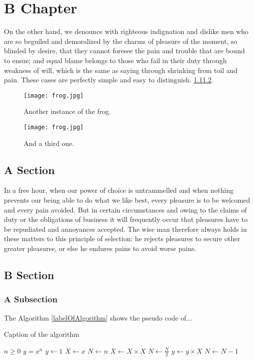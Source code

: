 \chapter{B Chapter}

On the other hand, we denounce with righteous indignation and dislike men who are so beguiled and demoralized by the charms of pleasure of the moment, so blinded by desire, that they cannot foresee the pain and trouble that are bound to ensue; and equal blame belongs to those who fail in their duty through weakness of will, which is the same as saying through shrinking from toil and pain. These cases are perfectly simple and easy to distinguish. \ref{fig:frogger}\ref{fig:froggerr}.

\begin{figure}[!htbp]
    \centering
    \texttt{[image: frog.jpg]}
    \caption{\label{fig:frogger}Another instance of the frog.}
\end{figure}
\begin{figure}[!htbp]
    \centering
    \texttt{[image: frog.jpg]}
    \caption{\label{fig:froggerr}And a third one.}
\end{figure}

\section{A Section}

In a free hour, when our power of choice is untrammelled and when nothing prevents our being able to do what we like best, every pleasure is to be welcomed and every pain avoided. But in certain circumstances and owing to the claims of duty or the obligations of business it will frequently occur that pleasures have to be repudiated and annoyances accepted. The wise man therefore always holds in these matters to this principle of selection: he rejects pleasures to secure other greater pleasures, or else he endures pains to avoid worse pains.

\section{B Section}

\subsection{A Subsection}
The Algorithm \ref{labelOfAlgorithm} shows the pseudo code of...

\begin{algorithm}
\caption{Caption of the algorithm}
\label{labelOfAlgorithm}
\begin{algorithmic}
\Require $n \geq 0$ %
\Ensure $y = x^n$  %
\State $y \gets 1$
\State $X \gets x$
\State $N \gets n$
    \State $X \gets X \times X$
    \State $N \gets \frac{N}{2}$  
    \State $y \gets y \times X$
    \State $N \gets N - 1$
\EndIf
\EndWhile
\end{algorithmic}
\end{algorithm}


